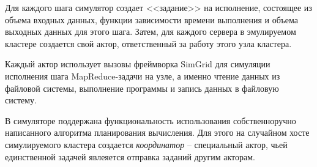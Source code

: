 \documentclass[../diploma.tex]{subfile}
\begin{document}
    Для каждого шага симулятор создает <<задание>> на исполнение, состоящее из
    объема входных данных, функции зависимости времени выполнения и объема
    выходных данных для этого шага. Затем, для каждого сервера в эмулируемом
    кластере создается свой актор, ответственный за работу этого узла кластера.

    Каждый актор использует вызовы фреймворка SimGrid для симуляции исполнения
    шага MapReduce-задачи на узле, а именно чтение данных из файловой системы,
    выполнение программы и запись данных в файловую систему.

    В симуляторе поддержана функциональность использования собственноручно
    написанного алгоритма планирования вычисления. Для этого на случайном хосте
    симулируемого кластера создается \textit{координатор} -- специальный актор,
    чьей единственной задачей явлеяется отправка заданий другим акторам.
\end{document}
